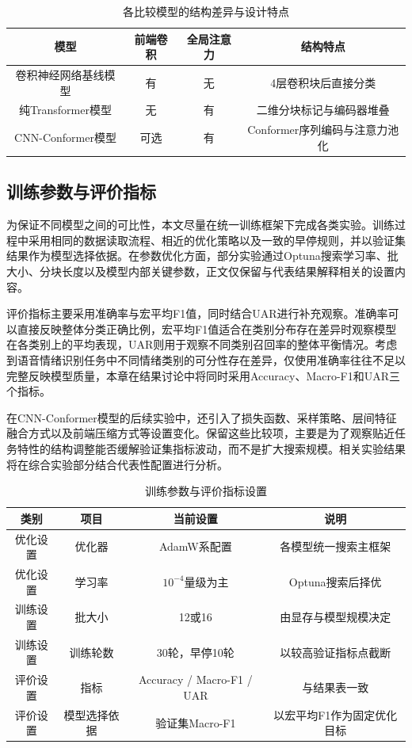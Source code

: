 \begin{table}[!htbp]
    \centering
    \caption{各比较模型的结构差异与设计特点}
    \label{tab:chapter4_model_compare}
    \begin{tabular}{cccc}
        \toprule
        模型 & 前端卷积 & 全局注意力 & 结构特点 \\
        \midrule
        卷积神经网络基线模型 & 有 & 无 & 4层卷积块后直接分类 \\
        纯Transformer模型 & 无 & 有 & 二维分块标记与编码器堆叠 \\
        CNN-Conformer模型 & 可选 & 有 & Conformer序列编码与注意力池化 \\
        \bottomrule
    \end{tabular}
\end{table}

\subsection{训练参数与评价指标}

为保证不同模型之间的可比性，本文尽量在统一训练框架下完成各类实验。训练过程中采用相同的数据读取流程、相近的优化策略以及一致的早停规则，并以验证集结果作为模型选择依据。在参数优化方面，部分实验通过Optuna搜索学习率、批大小、分块长度以及模型内部关键参数，正文仅保留与代表结果解释相关的设置内容。

评价指标主要采用准确率与宏平均F1值，同时结合UAR进行补充观察。准确率可以直接反映整体分类正确比例，宏平均F1值适合在类别分布存在差异时观察模型在各类别上的平均表现，UAR则用于观察不同类别召回率的整体平衡情况。考虑到语音情绪识别任务中不同情绪类别的可分性存在差异，仅使用准确率往往不足以完整反映模型质量，本章在结果讨论中将同时采用Accuracy、Macro-F1和UAR三个指标。

在CNN-Conformer模型的后续实验中，还引入了损失函数、采样策略、层间特征融合方式以及前端压缩方式等设置变化。保留这些比较项，主要是为了观察贴近任务特性的结构调整能否缓解验证集指标波动，而不是扩大搜索规模。相关实验结果将在综合实验部分结合代表性配置进行分析。

\begin{table}[!htbp]
    \centering
    \caption{训练参数与评价指标设置}
    \label{tab:chapter4_train_eval}
    \begin{tabular}{cccc}
        \toprule
        类别 & 项目 & 当前设置 & 说明 \\
        \midrule
        优化设置 & 优化器 & AdamW系配置 & 各模型统一搜索主框架 \\
        优化设置 & 学习率 & $10^{-4}$量级为主 & Optuna搜索后择优 \\
        训练设置 & 批大小 & 12或16 & 由显存与模型规模决定 \\
        训练设置 & 训练轮数 & 30轮，早停10轮 & 以较高验证指标点截断 \\
        评价设置 & 指标 & Accuracy / Macro-F1 / UAR & 与结果表一致 \\
        评价设置 & 模型选择依据 & 验证集Macro-F1 & 以宏平均F1作为固定优化目标 \\
        \bottomrule
    \end{tabular}
\end{table}

